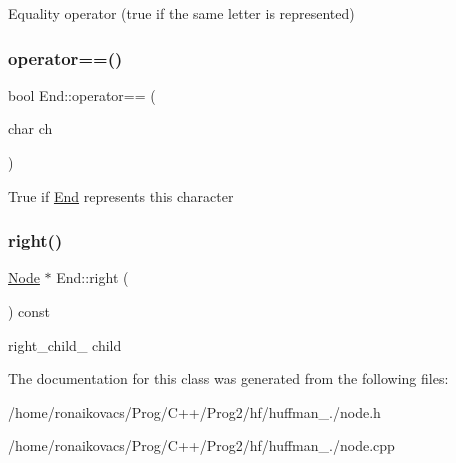 Equality operator (true if the same letter is represented) \mbox{\label{class_end_a0b3d32d1f08031447f6facf17ee17dff}} 
\subsubsection{\texorpdfstring{operator==()}{operator==()}\hspace{0.1cm}{\footnotesize\ttfamily [2/2]}}
{\footnotesize\ttfamily bool End\+::operator== (\begin{DoxyParamCaption}\item[{char}]{ch }\end{DoxyParamCaption})}

True if \hyperlink{class_end}{End} represents this character \mbox{\label{class_end_ac8e651d50ce2b99256be11aa9b89ded4}} 
\subsubsection{\texorpdfstring{right()}{right()}}
{\footnotesize\ttfamily \hyperlink{class_node}{Node} $\ast$ End\+::right (\begin{DoxyParamCaption}{ }\end{DoxyParamCaption}) const}

right\+\_\+child\+\_\+ child 

The documentation for this class was generated from the following files\+:\begin{DoxyCompactItemize}
\item 
/home/ronaikovacs/\+Prog/\+C++/\+Prog2/hf/huffman\+\_./node.\+h\item 
/home/ronaikovacs/\+Prog/\+C++/\+Prog2/hf/huffman\+\_./node.\+cpp\end{DoxyCompactItemize}
